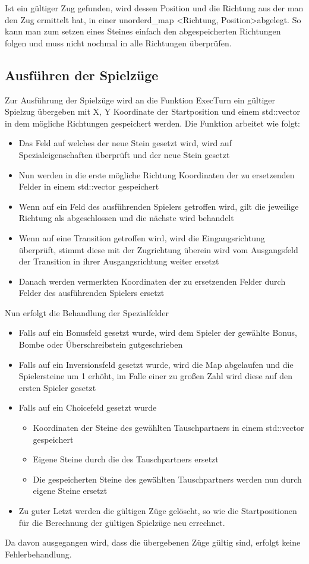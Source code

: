 \documentclass[12pt,a4paper,bibliography=totocnumbered,listof=totocnumbered]{scrartcl}
\begin{document}
Ist ein gültiger Zug gefunden, wird dessen Position und die Richtung aus der man den Zug ermittelt hat, in einer unorderd\_map \textless Richtung, Position\textgreater abgelegt. So kann man zum setzen eines Steines einfach den abgespeicherten Richtungen folgen und muss nicht nochmal in alle Richtungen überprüfen.


\pagebreak
\subsection{Ausführen der Spielzüge}
Zur Ausführung der Spielzüge wird an die Funktion ExecTurn ein gültiger Spielzug übergeben mit X, Y Koordinate der Startposition und einem std::vector in dem mögliche Richtungen gespeichert werden.
Die Funktion arbeitet wie folgt:
\begin{itemize}
\item Das Feld auf welches der neue Stein gesetzt wird, wird auf Spezialeigenschaften überprüft und der neue Stein gesetzt
\item Nun werden in die erste mögliche Richtung Koordinaten der zu ersetzenden Felder in einem std::vector gespeichert
\item Wenn auf ein Feld des ausführenden Spielers getroffen wird, gilt die jeweilige Richtung als abgeschlossen und die nächste wird behandelt
\item Wenn auf eine Transition getroffen wird, wird die Eingangsrichtung überprüft, stimmt diese mit der Zugrichtung überein wird vom Ausgangsfeld der Transition in ihrer Ausgangsrichtung weiter ersetzt
\item Danach werden vermerkten Koordinaten der zu ersetzenden Felder durch Felder des ausführenden Spielers ersetzt
\end{itemize}
Nun erfolgt die Behandlung der Spezialfelder
\begin{itemize}
\item Falls auf ein Bonusfeld gesetzt wurde, wird dem Spieler der gewählte Bonus, Bombe oder Überschreibstein gutgeschrieben
\item Falls auf ein Inversionsfeld gesetzt wurde, wird die Map abgelaufen und die Spielersteine um 1 erhöht, im Falle einer zu großen Zahl wird diese auf den ersten Spieler gesetzt
\item Falls auf ein Choicefeld gesetzt wurde
\begin{itemize}
\item Koordinaten der Steine des gewählten Tauschpartners in einem std::vector gespeichert
\item Eigene Steine durch die des Tauschpartners ersetzt
\item Die gespeicherten Steine des gewählten Tauschpartners werden nun durch eigene Steine ersetzt 
\end{itemize}
\item Zu guter Letzt werden die gültigen Züge gelöscht, so wie die Startpositionen für die Berechnung der gültigen Spielzüge neu errechnet.
\end{itemize}
Da davon ausgegangen wird, dass die übergebenen Züge gültig sind, erfolgt keine Fehlerbehandlung.
\end{document}
